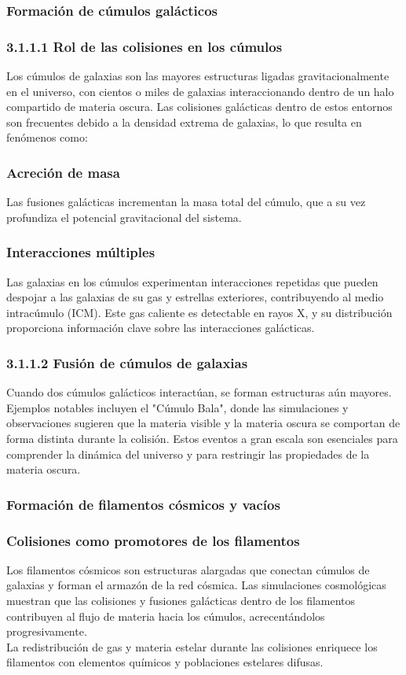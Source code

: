 \documentclass{article}
\begin{document}
\subsubsection{Formación de cúmulos galácticos}
\subsubsection*{3.1.1.1 Rol de las colisiones en los cúmulos}
Los cúmulos de galaxias son las mayores estructuras ligadas gravitacionalmente en el universo, con cientos o miles de galaxias interaccionando dentro de un halo compartido de materia oscura. Las colisiones galácticas dentro de estos entornos son frecuentes debido a la densidad extrema de galaxias, lo que resulta en fenómenos como:

\subsubsection*{Acreción de masa}
Las fusiones galácticas incrementan la masa total del cúmulo, que a su vez profundiza el potencial gravitacional del sistema.
\subsubsection*{Interacciones múltiples}
Las galaxias en los cúmulos experimentan interacciones repetidas que pueden despojar a las galaxias de su gas y estrellas exteriores, contribuyendo al medio intracúmulo (ICM). Este gas caliente es detectable en rayos X, y su distribución proporciona información clave sobre las interacciones galácticas.
\subsubsection*{3.1.1.2 Fusión de cúmulos de galaxias}
Cuando dos cúmulos galácticos interactúan, se forman estructuras aún mayores. Ejemplos notables incluyen el "Cúmulo Bala", donde las simulaciones y observaciones sugieren que la materia visible y la materia oscura se comportan de forma distinta durante la colisión. Estos eventos a gran escala son esenciales para comprender la dinámica del universo y para restringir las propiedades de la materia oscura.

\subsubsection{Formación de filamentos cósmicos y vacíos}
\subsubsection*{Colisiones como promotores de los filamentos}
Los filamentos cósmicos son estructuras alargadas que conectan cúmulos de galaxias y forman el armazón de la red cósmica. Las simulaciones cosmológicas muestran que las colisiones y fusiones galácticas dentro de los filamentos contribuyen al flujo de materia hacia los cúmulos, acrecentándolos progresivamente. \\
La redistribución de gas y materia estelar durante las colisiones enriquece los filamentos con elementos químicos y poblaciones estelares difusas.
\end{document}
